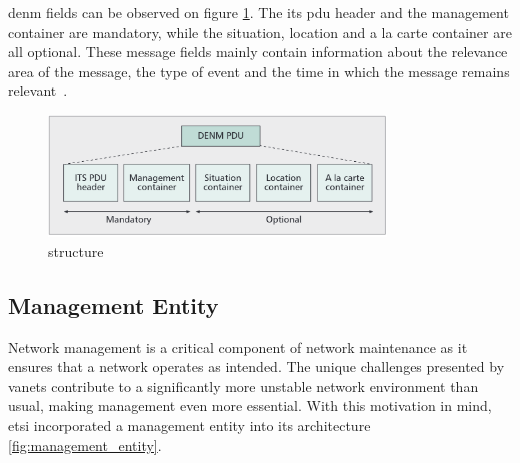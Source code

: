 \gls{denm} fields can be observed on figure \ref{fig:denm_structure}. The \gls{its} \gls{pdu} header and the management container are mandatory, while the situation, location and a la carte container are all optional. These message fields mainly contain information about the relevance area of the message, the type of event and the time in which the message remains relevant~\cite{al-sultan_comprehensive_2014}.

\begin{figure}[htbp]
    \centering
    \includegraphics[width=0.8\textwidth]{Chapters/Figures/VANETs/denm_structure.png}
   	\caption{ structure~\cite{festag_cooperative_2014}}
   	\label{fig:denm_structure}
\end{figure}


\subsection[Management Entity]{Management Entity}
\label{subsec:Security_of_VANETs}
Network management is a critical component of network maintenance as it ensures that a network operates as intended. The unique challenges presented by \glspl{vanet} contribute to a significantly more unstable network environment than usual, making management even more essential. With this motivation in mind, \gls{etsi} incorporated a management entity into its architecture \ref{fig:management_entity}.


